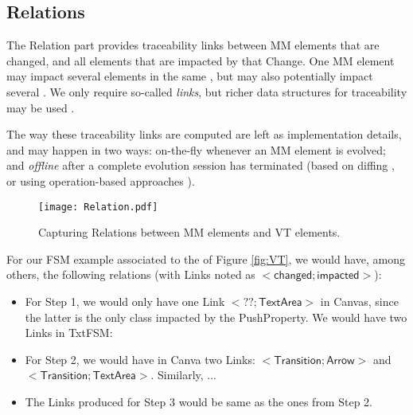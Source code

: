 \subsection{Relations}
\label{sec:Suggestion:Relation}

The \textsf{Relation} part provides traceability links between \textsf{MM}
elements that are \textsf{changed}, and all \viewtype elements that are 
\textsf{impacted} by that \textsf{Change}. One \textsf{MM} element
may impact several elements in the same \viewtype, but may also potentially
impact several \viewtypes. We only require so-called \emph{links}, but richer
data structures for traceability may be used \autocite{Batot-Cabot-Gerard:2021}.

The way these traceability links are computed are left as implementation
details, and may happen in two ways: \textsf{on-the-fly} whenever an \textsf{MM} element is evolved; and \emph{offline}
after a complete evolution session has terminated (based on diffing \autocite{Kehrer-Kelter-Taentzer:2011}, or using 
operation-based approaches \parencite{J:Lippe-Oosterom:1992}).

\begin{figure}[t]
    \centering
    \texttt{[image: Relation.pdf]}
    \caption{Capturing \textsf{Relation}s between \textsf{MM} elements and \textsf{VT} elements.}
    \label{fig:Relation}
\end{figure}

For our \textsf{FSM} example associated to the \viewtypes of Figure \ref{fig:VT},
we would have, among others, the following relations (with \textsf{Link}s noted 
as $\mathsf{<} \mathsf{changed} ; \mathsf{impacted} \mathsf{>}$):
\begin{itemize}
	\item For Step 1, we would only have one \textsf{Link} 
	$\mathsf{<} \mathsf{??} ; \mathsf{TextArea} \mathsf{>}$ in \textsf{Canvas}, 
	since the latter is the only class impacted by the \textsf{PushProperty}. We would
	have two \textsf{Link}s in \textsf{TxtFSM}: 
	
	\item For Step 2, we would have in \textsf{Canva} two \textsf{Link}s: 
	$\mathsf{<} \mathsf{Transition} ; \mathsf{Arrow} \mathsf{>}$ and
	$\mathsf{<} \mathsf{Transition} ; \mathsf{TextArea} \mathsf{>}$. Similarly, ...
	
	\item The \textsf{Link}s produced for Step 3 would be same as the ones
	from Step 2.
\end{itemize}